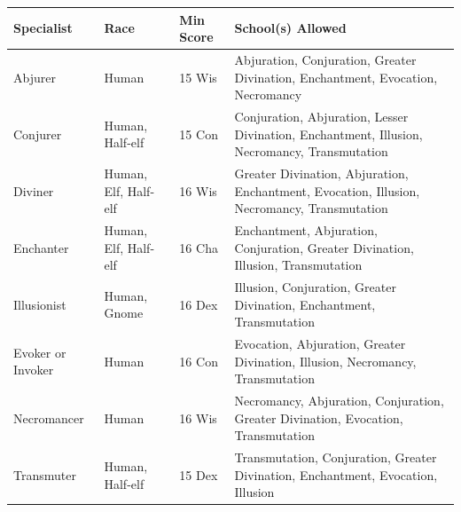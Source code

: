 \noindent
\begin{minipage}{\columnwidth}

\label{specialistrestrictions}
\noindent
\begin{tabular}{|p{}|p{}|p{}|p{}|}
\hline
Specialist	& Race	& Min Score	 & School(s) Allowed \\
\hline\hline
\rowcolor[gray]{.9}Abjurer	& Human	& 15 Wis	& Abjuration, Conjuration, Greater Divination, Enchantment, Evocation, Necromancy \\

Conjurer	& Human, Half-elf	& 15 Con	& Conjuration, Abjuration, Lesser Divination, Enchantment, Illusion, Necromancy, Transmutation \\

\rowcolor[gray]{.9}Diviner	& Human, Elf, Half-elf	& 16 Wis	& Greater Divination, Abjuration, Enchantment, Evocation, Illusion, Necromancy, Transmutation \\

Enchanter	& Human, Elf, Half-elf	& 16 Cha	& Enchantment, Abjuration, Conjuration, Greater Divination, Illusion, Transmutation \\

\rowcolor[gray]{.9}Illusionist	& Human, Gnome	& 16 Dex	& Illusion, Conjuration, Greater Divination, Enchantment, Transmutation \\

Evoker or Invoker	& Human	& 16 Con	& Evocation, Abjuration, Greater Divination, Illusion, Necromancy, Transmutation \\

\rowcolor[gray]{.9}Necromancer	& Human	& 16 Wis	& Necromancy, Abjuration, Conjuration, Greater Divination, Evocation, Transmutation \\

Transmuter	& Human, Half-elf	& 15 Dex	& Transmutation, Conjuration, Greater Divination, Enchantment, Evocation, Illusion \\
\hline
\end{tabular}

\end{minipage}

